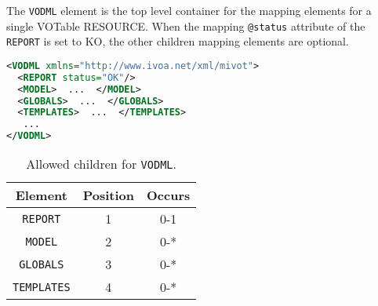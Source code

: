 The \texttt{VODML} element is the top level container for the mapping elements for a single VOTable RESOURCE.
When the mapping \texttt{@status} attribute of the \texttt{REPORT} is set to KO, the other children mapping elements are optional.

\begin{lstlisting}[caption={Example \texttt{VODML} mapping block.},language=XML]
<VODML xmlns="http://www.ivoa.net/xml/mivot">
  <REPORT status="OK"/>
  <MODEL>  ...  </MODEL>
  <GLOBALS>  ...  </GLOBALS>
  <TEMPLATES>  ...  </TEMPLATES>
   ...
</VODML>
\end{lstlisting}

\begin{table}[!htbp]
  \small
  \centering
  \begin{tabulary}{\linewidth}{|c |c |c|}
    \hline 
        \textbf{Element} &
        \textbf{Position} &
        \textbf{Occurs}\\
    \hline
    \hline  
      \texttt{REPORT} &           
      1 &           
      0-1\\
    \hline  
      \texttt{MODEL} &           
      2 &           
      0-*\\
    \hline    
      \texttt{GLOBALS} &           
      3 &           
      0-*\\
    \hline  
      \texttt{TEMPLATES} &           
      4 &           
      0-*\\
    \hline 
  \end{tabulary}
    \caption{Allowed children for \texttt{VODML}.} 
    \label{tbl:vodml-children}
\end{table}


